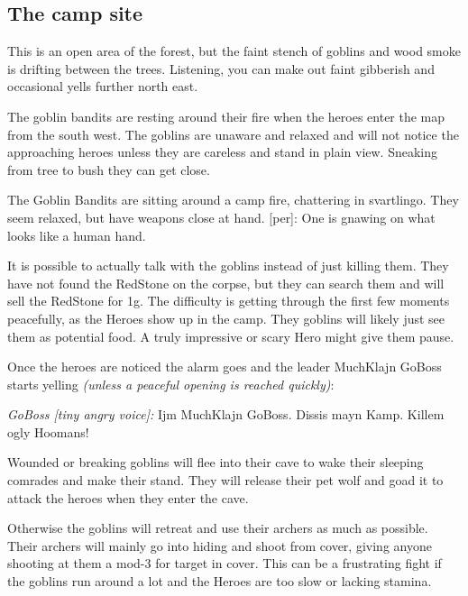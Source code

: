 \subsection*{The camp site}

\begin{readoutloud}
This is an open area of the forest, but the faint stench of goblins and wood smoke is drifting between the trees. Listening, you can make out faint gibberish and occasional yells further north east.
\end{readoutloud}

The goblin bandits are resting around their fire when the heroes enter the map from the south west. The goblins are unaware and relaxed and will not notice the approaching heroes unless they are careless and stand in plain view. Sneaking from tree to bush they can get close.

\begin{readoutloud}
The Goblin Bandits are sitting around a camp fire, chattering in svartlingo. They seem relaxed, but have weapons close at hand.
[per]: One is gnawing on what looks like a human hand.
\end{readoutloud}

It is possible to actually talk with the goblins instead of just killing them. They have not found the RedStone on the corpse, but they can search them and will sell the RedStone for 1g. The difficulty is getting through the first few moments peacefully, as the Heroes show up in the camp. They goblins will likely just see them as potential food. A truly impressive or scary Hero might give them pause.

Once the heroes are noticed the alarm goes and the leader MuchKlajn GoBoss starts yelling \emph{(unless a peaceful opening is reached quickly)}:

\begin{readoutloud}
\emph{GoBoss [tiny angry voice]:} Ijm MuchKlajn GoBoss. Dissis mayn Kamp. Killem ogly Hoomans!
\end{readoutloud}

Wounded or breaking goblins will flee into their cave to wake their sleeping comrades and make their stand. They will release their pet wolf and goad it to attack the heroes when they enter the cave.

Otherwise the goblins will retreat and use their archers as much as possible. Their archers will mainly go into hiding and shoot from cover, giving anyone shooting at them a mod-3 for target in cover.
This can be a frustrating fight if the goblins run around a lot and the Heroes are too slow or lacking stamina.

